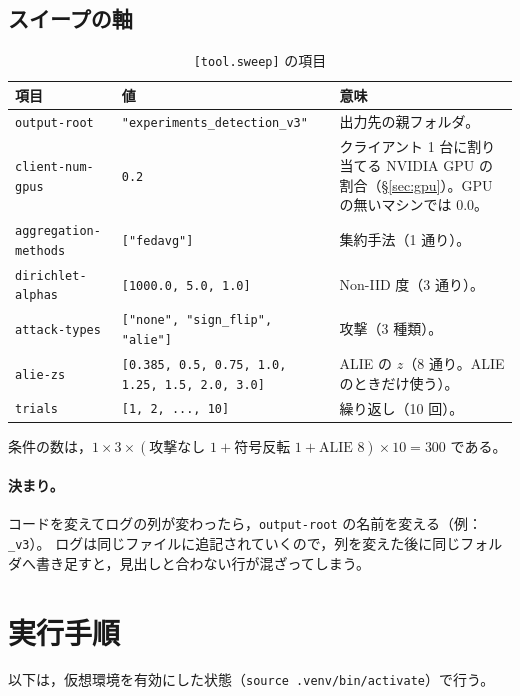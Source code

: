 \documentclass[a4j, dvipdfmx]{jsarticle}  %
\begin{document}
\subsection{スイープの軸}

\begin{table}[H]
\centering
\caption{\texttt{[tool.sweep]} の項目}
\begin{tabular}{@{}P{3.6cm} P{5.2cm} P{6.5cm}@{}}
\toprule
項目 & 値 & 意味 \\
\midrule
\texttt{output-root} & \texttt{"experiments\_detection\_v3"} & 出力先の親フォルダ。 \\
\texttt{client-num-gpus} & \texttt{0.2} & クライアント 1 台に割り当てる NVIDIA GPU の割合（\S\ref{sec:gpu}）。GPU の無いマシンでは 0.0。 \\
\texttt{aggregation-methods} & \texttt{["fedavg"]} & 集約手法（1 通り）。 \\
\texttt{dirichlet-alphas} & \texttt{[1000.0, 5.0, 1.0]} & Non-IID 度（3 通り）。 \\
\texttt{attack-types} & \texttt{["none", "sign\_flip", "alie"]} & 攻撃（3 種類）。 \\
\texttt{alie-zs} & \texttt{[0.385, 0.5, 0.75, 1.0, 1.25, 1.5, 2.0, 3.0]} & ALIE の $z$（8 通り。ALIE のときだけ使う）。 \\
\texttt{trials} & \texttt{[1, 2, ..., 10]} & 繰り返し（10 回）。 \\
\bottomrule
\end{tabular}
\end{table}

条件の数は，$1 \times 3 \times (\text{攻撃なし } 1 + \text{符号反転 } 1 + \text{ALIE } 8) \times 10 = 300$ である。

\paragraph{決まり。}
コードを変えてログの列が変わったら，\texttt{output-root} の名前を変える（例：\texttt{\_v3}）。
ログは同じファイルに追記されていくので，列を変えた後に同じフォルダへ書き足すと，見出しと合わない行が混ざってしまう。

\section{実行手順}
\label{sec:run}

以下は，仮想環境を有効にした状態（\texttt{source .venv/bin/activate}）で行う。
\end{document}
